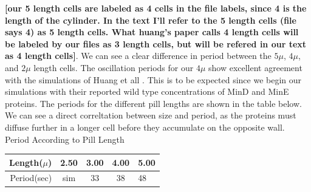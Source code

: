 \documentclass[letterpaper,twocolumn,amsmath,amssymb,pre]{revtex4-1}
\newcommand{\red}[1]{{\bf \color{red} #1}}
\newcommand{\fixme}[1]{\red{[#1]}}
\begin{document}
\fixme{our 5 length cells are labeled as 4 cells in the file labels,
  since 4 is the length of the cylinder. In the text I'll refer to the
  5 length cells (file says 4) as 5 length cells.  What huang's paper
  calls 4 length cells will be labeled by our files as 3 length cells,
  but will be refered in our text as 4 length cells}.  We can see a
clear difference in period between the $5\mu$, $4\mu$, and $2\mu$
length cells.  The oscillation periods for our $4\mu$ show excellent
agreement with the simulations of Huang et all
\cite{huang2003dynamic}.  This is to be expected since we begin our
simulations with their reported wild type concentrations of MinD and
MinE proteins. The periods for the different pill lengths are shown in
the table below.  We can see a direct correltation between size and
period, as the proteins must diffuse further in a longer cell before
they accumulate on the opposite wall.
\newline
\newline
Period According to Pill Length
\begin{tabular}{|r|c|c|c|l|}
  \hline
  Length($\mu$) & 2.50 & 3.00 & 4.00 & 5.00\\
  \hline
  Period(sec) & sim & 33 & 38 & 48 \\ \cline{2-2}
  \hline
\end{tabular}
\end{document}
